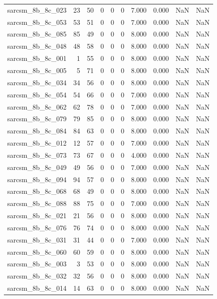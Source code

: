 \documentclass{article}
\begin{document}
\begin{longtable}{lrrrrrrrrr}
sarcsm\_8b\_8c\_023 & 23 & 50 & 0 & 0 & 0 & 7.000 & 0.000 & NaN & NaN \\
sarcsm\_8b\_8c\_053 & 53 & 51 & 0 & 0 & 0 & 7.000 & 0.000 & NaN & NaN \\
sarcsm\_8b\_8c\_085 & 85 & 49 & 0 & 0 & 0 & 8.000 & 0.000 & NaN & NaN \\
sarcsm\_8b\_8c\_048 & 48 & 58 & 0 & 0 & 0 & 8.000 & 0.000 & NaN & NaN \\
sarcsm\_8b\_8c\_001 & 1 & 55 & 0 & 0 & 0 & 8.000 & 0.000 & NaN & NaN \\
sarcsm\_8b\_8c\_005 & 5 & 71 & 0 & 0 & 0 & 8.000 & 0.000 & NaN & NaN \\
sarcsm\_8b\_8c\_034 & 34 & 56 & 0 & 0 & 0 & 8.000 & 0.000 & NaN & NaN \\
sarcsm\_8b\_8c\_054 & 54 & 66 & 0 & 0 & 0 & 7.000 & 0.000 & NaN & NaN \\
sarcsm\_8b\_8c\_062 & 62 & 78 & 0 & 0 & 0 & 7.000 & 0.000 & NaN & NaN \\
sarcsm\_8b\_8c\_079 & 79 & 85 & 0 & 0 & 0 & 8.000 & 0.000 & NaN & NaN \\
sarcsm\_8b\_8c\_084 & 84 & 63 & 0 & 0 & 0 & 8.000 & 0.000 & NaN & NaN \\
sarcsm\_8b\_8c\_012 & 12 & 57 & 0 & 0 & 0 & 7.000 & 0.000 & NaN & NaN \\
sarcsm\_8b\_8c\_073 & 73 & 67 & 0 & 0 & 0 & 4.000 & 0.000 & NaN & NaN \\
sarcsm\_8b\_8c\_049 & 49 & 56 & 0 & 0 & 0 & 7.000 & 0.000 & NaN & NaN \\
sarcsm\_8b\_8c\_094 & 94 & 57 & 0 & 0 & 0 & 8.000 & 0.000 & NaN & NaN \\
sarcsm\_8b\_8c\_068 & 68 & 49 & 0 & 0 & 0 & 8.000 & 0.000 & NaN & NaN \\
sarcsm\_8b\_8c\_088 & 88 & 75 & 0 & 0 & 0 & 7.000 & 0.000 & NaN & NaN \\
sarcsm\_8b\_8c\_021 & 21 & 56 & 0 & 0 & 0 & 8.000 & 0.000 & NaN & NaN \\
sarcsm\_8b\_8c\_076 & 76 & 74 & 0 & 0 & 0 & 8.000 & 0.000 & NaN & NaN \\
sarcsm\_8b\_8c\_031 & 31 & 44 & 0 & 0 & 0 & 7.000 & 0.000 & NaN & NaN \\
sarcsm\_8b\_8c\_060 & 60 & 59 & 0 & 0 & 0 & 8.000 & 0.000 & NaN & NaN \\
sarcsm\_8b\_8c\_003 & 3 & 53 & 0 & 0 & 0 & 8.000 & 0.000 & NaN & NaN \\
sarcsm\_8b\_8c\_032 & 32 & 56 & 0 & 0 & 0 & 8.000 & 0.000 & NaN & NaN \\
sarcsm\_8b\_8c\_014 & 14 & 63 & 0 & 0 & 0 & 8.000 & 0.000 & NaN & NaN \\

\end{longtable}
\end{document}
